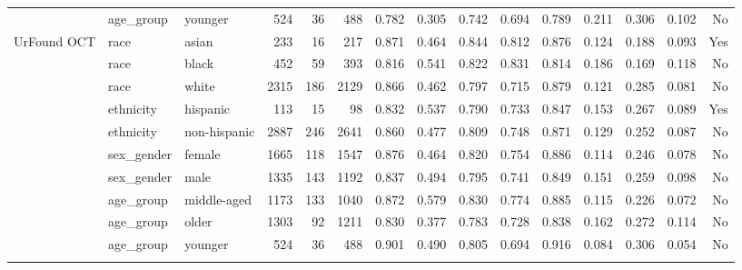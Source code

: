 \begin{longtable}{@{}lllrrrrrrrrrrrr@{}}
 & age\_group & younger & 524 & 36 & 488 & 0.782 & 0.305 & 0.742 & 0.694 & 0.789 & 0.211 & 0.306 & 0.102 & No \\
UrFound OCT & race & asian & 233 & 16 & 217 & 0.871 & 0.464 & 0.844 & 0.812 & 0.876 & 0.124 & 0.188 & 0.093 & Yes \\
 & race & black & 452 & 59 & 393 & 0.816 & 0.541 & 0.822 & 0.831 & 0.814 & 0.186 & 0.169 & 0.118 & No \\
 & race & white & 2315 & 186 & 2129 & 0.866 & 0.462 & 0.797 & 0.715 & 0.879 & 0.121 & 0.285 & 0.081 & No \\
 & ethnicity & hispanic & 113 & 15 & 98 & 0.832 & 0.537 & 0.790 & 0.733 & 0.847 & 0.153 & 0.267 & 0.089 & Yes \\
 & ethnicity & non-hispanic & 2887 & 246 & 2641 & 0.860 & 0.477 & 0.809 & 0.748 & 0.871 & 0.129 & 0.252 & 0.087 & No \\
 & sex\_gender & female & 1665 & 118 & 1547 & 0.876 & 0.464 & 0.820 & 0.754 & 0.886 & 0.114 & 0.246 & 0.078 & No \\
 & sex\_gender & male & 1335 & 143 & 1192 & 0.837 & 0.494 & 0.795 & 0.741 & 0.849 & 0.151 & 0.259 & 0.098 & No \\
 & age\_group & middle-aged & 1173 & 133 & 1040 & 0.872 & 0.579 & 0.830 & 0.774 & 0.885 & 0.115 & 0.226 & 0.072 & No \\
 & age\_group & older & 1303 & 92 & 1211 & 0.830 & 0.377 & 0.783 & 0.728 & 0.838 & 0.162 & 0.272 & 0.114 & No \\
 & age\_group & younger & 524 & 36 & 488 & 0.901 & 0.490 & 0.805 & 0.694 & 0.916 & 0.084 & 0.306 & 0.054 & No \\
\botrule
\end{longtable}
\endgroup
